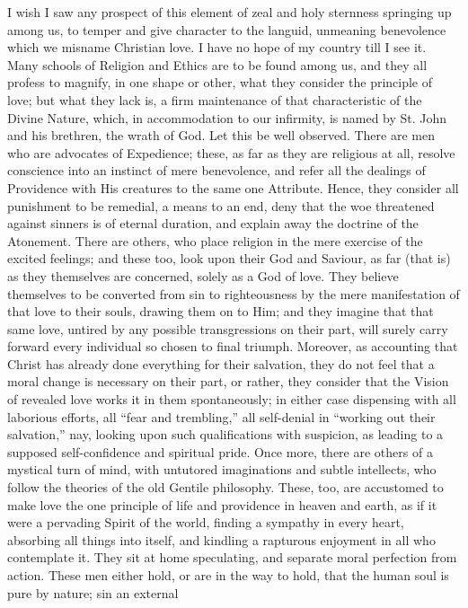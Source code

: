 I wish I saw any prospect of this element of zeal and holy sternness
springing up among us, to temper and give character to the languid,
unmeaning benevolence which we misname Christian love. I have no hope of
my country till I see it. Many schools of Religion and Ethics are to be
found among us, and they all profess to magnify, in one shape or other,
what they consider the principle of love; but what they lack is, a firm
maintenance of that characteristic of the Divine Nature, which, in
accommodation to our infirmity, is named by St. John and his brethren,
the wrath of God. Let this be well observed. There are men who are
advocates of Expedience; these, as far as they are religious at all,
resolve conscience into an instinct of mere benevolence, and refer all
the dealings of Providence with His creatures to the same one Attribute.
Hence, they consider all punishment to be remedial, a means to an end,
deny that the woe threatened against sinners is of eternal duration, and
explain away the doctrine of the Atonement. There are others, who place
religion in the mere exercise of the excited feelings; and these too,
look upon their God and Saviour, as far (that is) as they themselves are
concerned, solely as a God of love. They believe themselves to be
converted from sin to righteousness by the mere manifestation of that
love to their souls, drawing them on to Him; and they imagine that that
same love, untired by any possible transgressions on their part, will
surely carry forward every individual so chosen to final triumph.
Moreover, as accounting that Christ has already done everything for
their salvation, they do not feel that a moral change is necessary on
their part, or rather, they consider that the Vision of revealed love
works it in them spontaneously; in either case dispensing with all
laborious efforts, all ``fear and trembling,'' all self-denial
in ``working out their salvation,'' nay, looking upon such
qualifications with suspicion, as leading to a supposed self-confidence
and spiritual pride. Once more, there are others of a mystical turn of
mind, with untutored imaginations and subtle intellects, who follow the
theories of the old Gentile philosophy. These, too, are accustomed to
make love the one principle of life and providence in heaven and earth,
as if it were a pervading Spirit of the world, finding a sympathy in
every heart, absorbing all things into itself, and kindling a rapturous
enjoyment in all who contemplate it. They sit at home speculating, and
separate moral perfection from action. These men either hold, or are in
the way to hold, that the human soul is pure by nature; sin an external
